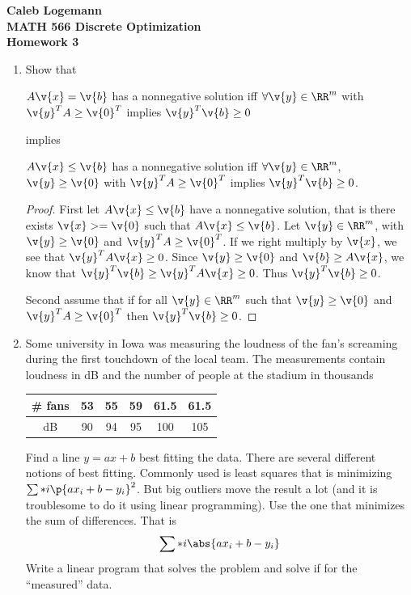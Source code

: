 \documentclass[11pt, oneside]{article}
\begin{document}
\noindent \textbf{\Large{Caleb Logemann \\
MATH 566 Discrete Optimization\\
Homework 3
}}

%
\begin{enumerate}
    \item %
        Show that
        \begin{center}
            $A\v{x} = \v{b}$ has a nonnegative solution iff
            $\forall \v{y} \in \RR^m$ with $\v{y}^T A \ge \v{0}^T$ implies
            $\v{y}^T \v{b} \ge 0$
        \end{center}
        implies
        \begin{center}
            $A\v{x} \le \v{b}$ has a nonnegative solution iff
            $\forall \v{y} \in \RR^m$, $\v{y} \ge \v{0}$ with $\v{y}^T A \ge \v{0}^T$
            implies $\v{y}^T \v{b} \ge 0$.
        \end{center}

        \begin{proof}
            First let $A\v{x} \le \v{b}$ have a nonnegative solution, that is
            there exists $\v{x} >= \v{0}$ such that $A\v{x} \le \v{b}$.
            Let $\v{y} \in \RR^m$, with $\v{y} \ge \v{0}$ and $\v{y}^T A \ge \v{0}^T$.
            If we right multiply by $\v{x}$, we see that $\v{y}^T A\v{x} \ge 0$.
            Since $\v{y} \ge \v{0}$ and $\v{b} \ge A\v{x}$, we know that
            $\v{y}^T \v{b} \ge \v{y}^T A\v{x} \ge 0$.
            Thus $\v{y}^T \v{b} \ge 0$.

            Second assume that if for all $\v{y} \in \RR^m$ such that
            $\v{y} \ge \v{0}$ and $\v{y}^T A \ge \v{0}^T$ then
            $\v{y}^T \v{b} \ge 0$.
        \end{proof}

    \item %
        Some university in Iowa was measuring the loudness of the fan's
        screaming during the first touchdown of the local team.
        The measurements contain loudness in dB and the number of people at the
        stadium in thousands
        \begin{center}
            \begin{tabular}{*{6}c}
                \toprule
                \# fans & 53 & 55 & 59 & 61.5 & 61.5 \\
                \midrule
                dB     & 90 & 94 & 95 &  100 &  105 \\
                \bottomrule
            \end{tabular}
        \end{center}
        Find a line $y = ax + b$ best fitting the data.
        There are several different notions of best fitting.
        Commonly used is least squares that is minimizing $\sum*{i}{}{\p{ax_i + b - y_i}^2}$.
        But big outliers move the result a lot (and it is troublesome to do it
        using linear programming).
        Use the one that minimizes the sum of differences. That is
        \[
            \sum*{i}{}{\abs{a x_i + b - y_i}}
        \]
        Write a linear program that solves the problem and solve if for the
        ``measured'' data.


\end{enumerate}
\end{document}
